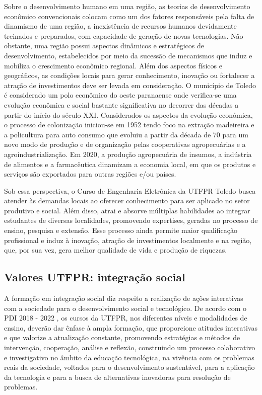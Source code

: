 Sobre o desenvolvimento humano em uma região, as teorias de desenvolvimento econômico convencionais colocam como um dos fatores responsáveis pela falta de dinamismo de uma região, a inexistência de recursos humanos devidamente treinados e preparados, com capacidade de geração de novas tecnologias.  Não obstante, uma região possui aspectos dinâmicos e estratégicos de desenvolvimento, estabelecidos por meio da sucessão de mecanismos que induz e mobiliza o crescimento econômico regional. Além dos aspectos físicos e geográficos, as condições locais para gerar conhecimento, inovação ou fortalecer a atração de investimentos deve ser levada em consideração. O município de Toledo é considerado um polo econômico do oeste paranaense onde verifica-se uma evolução econômica e social bastante significativa no decorrer das décadas a partir do início do século XXI. Considerados os aspectos da evolução econômica, o processo de colonização iniciou-se em 1952 tendo foco na extração madeireira e a policultura para auto consumo que evoluiu a partir da década de 70 para um novo modo de produção e de organização pelas cooperativas agropecuárias e a agroindustrialização.  Em 2020, a produção agropecuária de insumos, a indústria de alimentos e a farmacêutica dinamizam a economia local, em que os produtos e serviços são exportados para outras regiões e/ou países. 

Sob essa perspectiva, o Curso de Engenharia Eletrônica da UTFPR Toledo busca atender às demandas locais ao oferecer conhecimento para ser aplicado no setor produtivo e social. Além disso, atrai e absorve múltiplas habilidades ao integrar estudantes de diversas localidades, promovendo expertises, geradas no processo de ensino, pesquisa e extensão. Esse processo ainda permite maior qualificação profissional e induz à inovação, atração de investimentos localmente e na região, que, por sua vez, gera melhor qualidade de vida e produção de riquezas.

\subsection{Valores UTFPR: integração social}

A formação em integração social diz respeito a realização de ações interativas com a sociedade para o desenvolvimento social e tecnológico. De acordo com o PDI 2018 - 2022 \cite{pdiutfpr}, os cursos da UTFPR, nos diferentes níveis e modalidades de ensino, deverão dar ênfase à ampla formação, que proporcione atitudes interativas e que valorize a atualização constante, promovendo estratégias e métodos de intervenção, cooperação, análise e reflexão, construindo um processo colaborativo e investigativo no âmbito da educação tecnológica, na vivência com os problemas reais da sociedade, voltados para o desenvolvimento sustentável, para a aplicação da tecnologia e para a busca de alternativas inovadoras para resolução de problemas.

